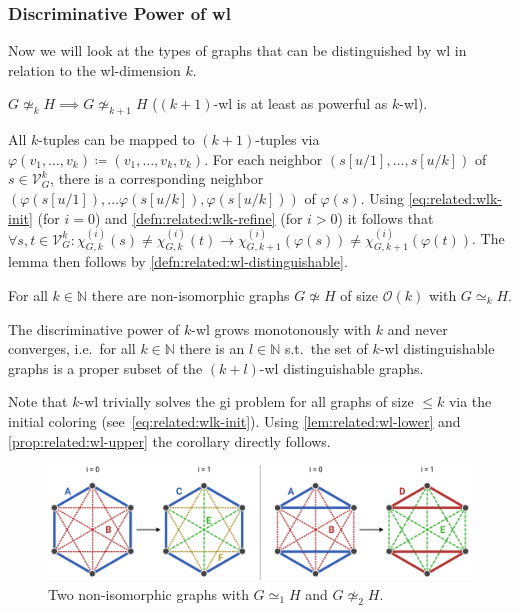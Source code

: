 \subsubsection{Discriminative Power of \acs{wl}}
Now we will look at the types of graphs that can be distinguished by \acs{wl} in relation to the \acs{wl}-dimension $k$.
\begin{lem}\label{lem:related:wl-lower}
	$G \mathrel{\not\simeq_k} H \implies G \mathrel{\not\simeq_{k+1}} H$ ($(k+1)$-\acs{wl} is at least as powerful as $k$-\acs{wl}).
\end{lem}
\begin{hproof}
	All $k$-tuples can be mapped to $(k+1)$-tuples via $\varphi(v_1, \dots, v_k) \coloneqq (v_1, \dots,\allowbreak v_k, v_k)$.
	For each neighbor $(s[u/1], \dots,\allowbreak s[u/k])$ of $s \in \mathcal{V}_G^k$, there is a corresponding neighbor $(\varphi(s[u/1]), \dots \varphi(s[u/k]), \varphi(s[u/k]))$ of $\varphi(s)$.
	Using \cref{eq:related:wlk-init} (for $i = 0$) and \cref{defn:related:wlk-refine} (for $i > 0$) it follows that $\forall s, t \in \mathcal{V}_G^k: \chi_{G, k}^{(i)}(s) \neq \chi_{G, k}^{(i)}(t) \rightarrow \chi_{G, k+1}^{(i)}(\varphi(s)) \neq \chi_{G, k+1}^{(i)}(\varphi(t))$.
	The lemma then follows by \cref{defn:related:wl-distinguishable}.
\end{hproof}
\begin{prop}\label{prop:related:wl-upper}
	For all $k \in \mathbb{N}$ there are non-isomorphic graphs $G \not\simeq H$ of size $\mathcal{O}(k)$ with $G \mathrel{\simeq_k} H$.
\end{prop}
\begin{cor}\label{cor:related:wl-monotonous}
	The discriminative power of $k$-\acs{wl} grows monotonously with $k$ and never converges, i.e.\ for all $k \in \mathbb{N}$ there is an $l \in \mathbb{N}$ s.t.\ the set of $k$-\ac{wl} distinguishable graphs is a proper subset of the $(k+l)$-\ac{wl} distinguishable graphs.
\end{cor}
\begin{hproof}
	Note that $k$-\acs{wl} trivially solves the \ac{gi} problem for all graphs of size $\leq k$ via the initial coloring (see~\cref{eq:related:wlk-init}).
	Using \cref{lem:related:wl-lower} and \cref{prop:related:wl-upper} the corollary directly follows.
\end{hproof}
\begin{figure}[ht]
	\centering
	\includegraphics[width=\linewidth]{gfx/related-work/wl2-problem-solution.pdf}
	\caption{
		Two non-isomorphic graphs with $G \mathrel{\simeq_1} H$ and $G \mathrel{\not\simeq_2} H$.
	}\label{fig:related:wl2-problem-solution}
\end{figure}
